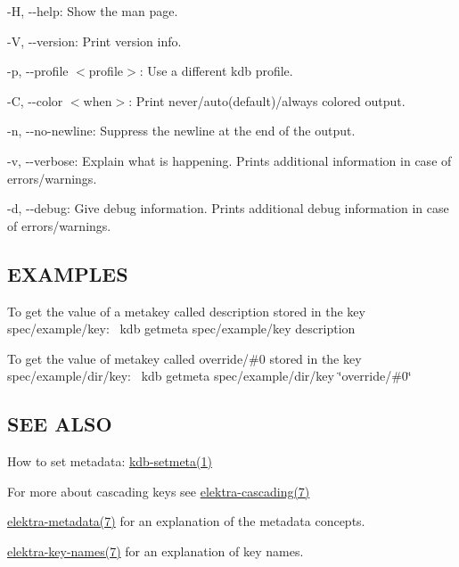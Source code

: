 \begin{DoxyItemize}
\item {\ttfamily -\/H}, {\ttfamily -\/-\/help}\+: Show the man page.
\item {\ttfamily -\/V}, {\ttfamily -\/-\/version}\+: Print version info.
\item {\ttfamily -\/p}, {\ttfamily -\/-\/profile $<$profile$>$}\+: Use a different kdb profile.
\item {\ttfamily -\/C}, {\ttfamily -\/-\/color $<$when$>$}\+: Print never/auto(default)/always colored output.
\item {\ttfamily -\/n}, {\ttfamily -\/-\/no-\/newline}\+: Suppress the newline at the end of the output.
\item {\ttfamily -\/v}, {\ttfamily -\/-\/verbose}\+: Explain what is happening. Prints additional information in case of errors/warnings.
\item {\ttfamily -\/d}, {\ttfamily -\/-\/debug}\+: Give debug information. Prints additional debug information in case of errors/warnings.
\end{DoxyItemize}

\subsection*{E\+X\+A\+M\+P\+L\+ES}

To get the value of a metakey called {\ttfamily description} stored in the key {\ttfamily spec/example/key}\+:~\newline
 {\ttfamily kdb getmeta spec/example/key description}

To get the value of metakey called {\ttfamily override/\#0} stored in the key {\ttfamily spec/example/dir/key}\+:~\newline
 {\ttfamily kdb getmeta spec/example/dir/key \char`\"{}override/\#0\char`\"{}}

\subsection*{S\+EE A\+L\+SO}


\begin{DoxyItemize}
\item How to set metadata\+: \hyperlink{doc_help_kdb-setmeta_md}{kdb-\/setmeta(1)}
\item For more about cascading keys see \hyperlink{doc_help_elektra-cascading_md}{elektra-\/cascading(7)}
\item \hyperlink{doc_help_elektra-metadata_md}{elektra-\/metadata(7)} for an explanation of the metadata concepts.
\item \hyperlink{doc_help_elektra-key-names_md}{elektra-\/key-\/names(7)} for an explanation of key names. 
\end{DoxyItemize}